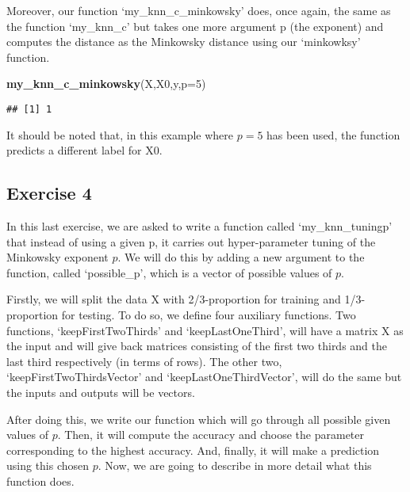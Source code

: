 \documentclass[
]{article}
\newenvironment{Shaded}{\begin{snugshade}}{\end{snugshade}}
\newcommand{\AttributeTok}[1]{\textcolor[rgb]{0.13,0.29,0.53}{#1}}
\newcommand{\DecValTok}[1]{\textcolor[rgb]{0.00,0.00,0.81}{#1}}
\newcommand{\FunctionTok}[1]{\textcolor[rgb]{0.13,0.29,0.53}{\textbf{#1}}}
\newcommand{\NormalTok}[1]{#1}
\begin{document}
Moreover, our function `my\_knn\_c\_minkowsky' does, once again, the
same as the function `my\_knn\_c' but takes one more argument p (the
exponent) and computes the distance as the Minkowsky distance using our
`minkowksy' function.

\begin{Shaded}
\begin{Highlighting}[]
\FunctionTok{my\_knn\_c\_minkowsky}\NormalTok{(X,X0,y,}\AttributeTok{p=}\DecValTok{5}\NormalTok{)}
\end{Highlighting}
\end{Shaded}

\begin{verbatim}
## [1] 1
\end{verbatim}

It should be noted that, in this example where \(p=5\) has been used,
the function predicts a different label for X0.

\hypertarget{exercise-4}{%
\subsection{Exercise 4}\label{exercise-4}}

In this last exercise, we are asked to write a function called
`my\_knn\_tuningp' that instead of using a given p, it carries out
hyper-parameter tuning of the Minkowsky exponent \(p\). We will do this
by adding a new argument to the function, called `possible\_p', which is
a vector of possible values of \(p\).

Firstly, we will split the data X with 2/3-proportion for training and
1/3-proportion for testing. To do so, we define four auxiliary
functions. Two functions, `keepFirstTwoThirds' and `keepLastOneThird',
will have a matrix X as the input and will give back matrices consisting
of the first two thirds and the last third respectively (in terms of
rows). The other two, `keepFirstTwoThirdsVector' and
`keepLastOneThirdVector', will do the same but the inputs and outputs
will be vectors.

After doing this, we write our function which will go through all
possible given values of \(p\). Then, it will compute the accuracy and
choose the parameter corresponding to the highest accuracy. And,
finally, it will make a prediction using this chosen \(p\). Now, we are
going to describe in more detail what this function does.
\end{document}
